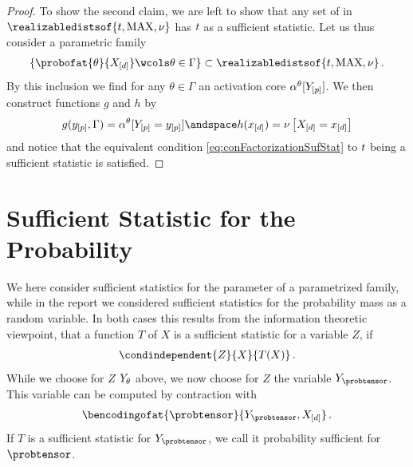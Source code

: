 \documentclass[aps,onecolumn,nofootinbib,pra]{article}
\begin{document}
\begin{proof}
        To show the second claim, we are left to show that any set of \ComputationActivationNetworks{} in $\realizabledistsof{\sstat,\maxgraph,\basemeasure}$ has $t$ as a sufficient statistic.
        Let us thus consider a parametric family
        \begin{align*}
            \{\probofat{\theta}{\shortcatvariables}\wcols\theta\in\Gamma\}
            \subset \realizabledistsof{\sstat,\maxgraph,\basemeasure} \, .
        \end{align*}
        By this inclusion we find for any $\theta\in\Gamma$ an activation core $\alpha^{\theta}[Y_{[p]}]$.
        We then construct functions $g$ and $h$ by
        \begin{align*}
            g(\shortheadindices,\Gamma) = \actcoreofat{\theta}{\indexedheadvariableof{[\seldim]}}
            \andspace
            h(\shortcatindices) = \basemeasureat{\indexedshortcatvariables}
        \end{align*}
        and notice that the equivalent condition \eqref{eq:conFactorizationSufStat} to $t$ being a sufficient statistic is satisfied.
    \end{proof}


    \section{Sufficient Statistic for the Probability}

    We here consider sufficient statistics for the parameter of a parametrized family, while in the report we considered sufficient statistics for the probability mass as a random variable.
    In both cases this results from the information theoretic viewpoint, that a function $T$ of $X$ is a sufficient statistic for a variable $Z$, if
    \begin{align*}
        \condindependent{Z}{X}{T(X)} \, .
    \end{align*}
    While we choose for $Z$ $Y_{\theta}$ above, we now choose for $Z$ the variable $\headvariableof{\probtensor}$.
    This variable can be computed by contraction with
    \begin{align*}
        \bencodingofat{\probtensor}{\headvariableof{\probtensor},\shortcatvariables} \, .
    \end{align*}
    If $T$ is a sufficient statistic for $\headvariableof{\probtensor}$, we call it probability sufficient for $\probtensor$.
\end{document}
